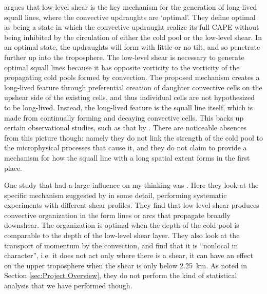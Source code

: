 \documentclass[11pt,a4paper]{article}
\newcommand\todo[1]{\textbf{TODO: #1}}
\begin{document}
\cite{RKW1988} argues that low-level shear is the key mechanism for the generation of long-lived squall lines, where the convective updraughts are `optimal'. They define optimal as being a state in which the convective updraught realize its full CAPE without being inhibited by the circulation of either the cold pool or the low-level shear. In an optimal state, the updraughts will form with little or no tilt, and so penetrate further up into the troposphere. The low-level shear is necessary to generate optimal squall lines because it has opposite vorticity to the vorticity of the propagating cold pools formed by convection. The proposed mechanism creates a long-lived feature through preferential creation of daughter convective cells on the upshear side of the existing cells, and thus individual cells are not hypothesized to be long-lived. Instead, the long-lived feature is the squall line itself, which is made from continually forming and decaying convective cells. This backs up certain observational studies, such as that by \cite{houze1977structure}. There are noticeable absences from this picture though: namely they do not link the strength of the cold pool to the microphysical processes that cause it, and they do not claim to provide a mechanism for how the squall line with a long spatial extent forms in the first place. %

One study that had a large influence on my thinking was \cite{RE2001}. Here they look at the specific mechanism suggested by \cite{RKW1988} in some detail, performing systematic experiments with different shear profiles. They find that low-level shear produces convective organization in the form lines or arcs that propagate broadly downshear. The organization is optimal when the depth of the cold pool is comparable to the depth of the low-level shear layer. They also look at the transport of momentum by the convection, and find that it is ``nonlocal in character'', i.e. it does not act only where there is a shear, it can have an effect on the upper troposphere when the shear is only below \SI{2.25}{km}. As noted in Section \ref{sec:Project Overview}, they do not perform the kind of statistical analysis that we have performed though.


\end{document}
